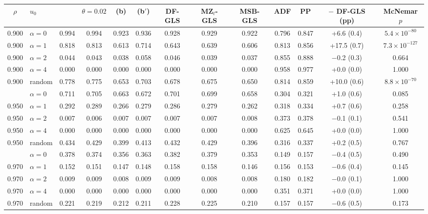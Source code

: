 \begin{tabular}{clccccccccccc}
\toprule
$\rho$ & $u_0$ & \RMGLS{} & $\theta = 0.02$ & (b) & (b$'$) & DF-GLS & MZ$_t$-GLS & MSB-GLS & ADF & PP & \RMGLS{} $-$ DF-GLS (pp) & McNemar $p$ \\
\midrule
0.900 & $\alpha = 0$ & 0.994 & 0.994 & 0.923 & 0.936 & 0.928 & 0.929 & 0.922 & 0.796 & 0.847 & +6.6 (0.4) & $5.4\times10^{-80}$ \\
0.900 & $\alpha = 1$ & 0.818 & 0.813 & 0.613 & 0.714 & 0.643 & 0.639 & 0.606 & 0.813 & 0.856 & +17.5 (0.7) & $7.3\times10^{-127}$ \\
0.900 & $\alpha = 2$ & 0.044 & 0.043 & 0.038 & 0.058 & 0.046 & 0.039 & 0.037 & 0.855 & 0.888 & $-$0.2 (0.3) & 0.664 \\
0.900 & $\alpha = 4$ & 0.000 & 0.000 & 0.000 & 0.000 & 0.000 & 0.000 & 0.000 & 0.958 & 0.977 & +0.0 (0.0) & 1.000 \\
0.900 & random & 0.778 & 0.775 & 0.653 & 0.703 & 0.678 & 0.675 & 0.650 & 0.814 & 0.859 & +10.0 (0.6) & $8.8\times10^{-70}$ \\
\addlinespace
0.950 & $\alpha = 0$ & 0.711 & 0.705 & 0.663 & 0.672 & 0.701 & 0.699 & 0.658 & 0.304 & 0.321 & +1.0 (0.6) & 0.085 \\
0.950 & $\alpha = 1$ & 0.292 & 0.289 & 0.266 & 0.279 & 0.286 & 0.279 & 0.262 & 0.318 & 0.334 & +0.7 (0.6) & 0.258 \\
0.950 & $\alpha = 2$ & 0.007 & 0.006 & 0.007 & 0.007 & 0.007 & 0.007 & 0.008 & 0.373 & 0.378 & $-$0.1 (0.1) & 0.541 \\
0.950 & $\alpha = 4$ & 0.000 & 0.000 & 0.000 & 0.000 & 0.000 & 0.000 & 0.000 & 0.625 & 0.645 & +0.0 (0.0) & 1.000 \\
0.950 & random & 0.434 & 0.429 & 0.399 & 0.413 & 0.432 & 0.429 & 0.396 & 0.316 & 0.337 & +0.2 (0.5) & 0.767 \\
\addlinespace
0.970 & $\alpha = 0$ & 0.378 & 0.374 & 0.356 & 0.363 & 0.382 & 0.379 & 0.353 & 0.149 & 0.157 & $-$0.4 (0.5) & 0.490 \\
0.970 & $\alpha = 1$ & 0.152 & 0.151 & 0.147 & 0.148 & 0.158 & 0.158 & 0.146 & 0.156 & 0.153 & $-$0.6 (0.4) & 0.145 \\
0.970 & $\alpha = 2$ & 0.009 & 0.009 & 0.008 & 0.009 & 0.009 & 0.008 & 0.008 & 0.180 & 0.182 & $-$0.0 (0.1) & 1.000 \\
0.970 & $\alpha = 4$ & 0.000 & 0.000 & 0.000 & 0.000 & 0.000 & 0.000 & 0.000 & 0.351 & 0.371 & +0.0 (0.0) & 1.000 \\
0.970 & random & 0.221 & 0.219 & 0.212 & 0.211 & 0.228 & 0.225 & 0.210 & 0.157 & 0.157 & $-$0.6 (0.5) & 0.173 \\
\bottomrule
\end{tabular}
